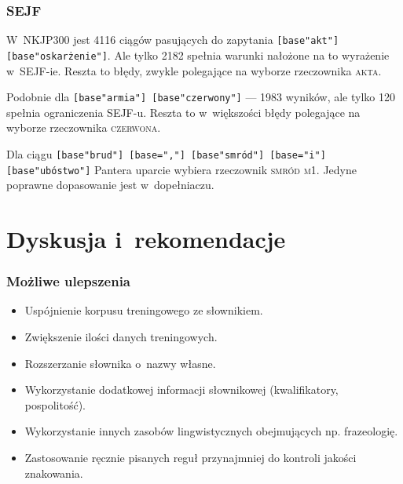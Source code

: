 \documentclass[xcolor=dvipsnames,polish]{beamer}
\newcommand{\textapprox}{\raisebox{0.5ex}{\texttildelow}}
\begin{document}
\begin{frame}
\frametitle{SEJF}
W~NKJP300 jest 4116 ciągów pasujących do zapytania
\texttt{[base\textapprox "akt"] [base\textapprox "oskarżenie"]}. Ale tylko 2182 spełnia
warunki nałożone na to wyrażenie w~SEJF-ie. Reszta to błędy, zwykle
polegające na wyborze rzeczownika \textsc{akta}.

\bigskip
\pause

Podobnie dla \texttt{[base\textapprox"armia"] [base\textapprox"czerwony"]} --- 1983
wyników, ale tylko 120 spełnia ograniczenia SEJF-u. Reszta to
w~większości błędy polegające na wyborze rzeczownika
\textsc{czerwona}.

\bigskip
\pause

Dla ciągu \texttt{[base\textapprox"brud"] [base=","]
  [base\textapprox"smród"] [base="i"] [base\textapprox"ubóstwo"]}
Pantera uparcie wybiera rzeczownik \textsc{smród} \textsc{m1}. Jedyne
poprawne dopasowanie jest w~dopełniaczu.

\end{frame}


\section{Dyskusja i~rekomendacje}
\frame{\sectionpage}

\begin{frame}
  \frametitle{Możliwe ulepszenia}

  \begin{itemize}
  \item Uspójnienie korpusu treningowego ze słownikiem.
  \item Zwiększenie ilości danych treningowych.
  \item Rozszerzanie słownika o~nazwy własne.
  \item Wykorzystanie dodatkowej informacji słownikowej
    (kwalifikatory, pospolitość).
  \item Wykorzystanie innych zasobów lingwistycznych obejmujących
    np. frazeologię.
  \item Zastosowanie ręcznie pisanych reguł \pauza przynajmniej do
    kontroli jakości znakowania.
  \end{itemize}


\end{frame}
\end{document}
